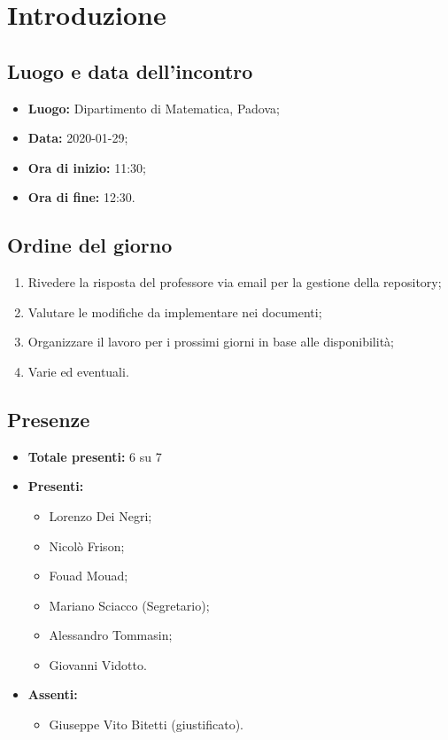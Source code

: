 \section*{Introduzione}

\subsection*{Luogo e data dell'incontro}
	\begin{itemize}
		\item \textbf{Luogo:} Dipartimento di Matematica, Padova;
		\item \textbf{Data:} 2020-01-29;
		\item \textbf{Ora di inizio:} 11:30;
		\item \textbf{Ora di fine:} 12:30.
	\end{itemize}

\subsection*{Ordine del giorno}
	\begin{enumerate}
			\item Rivedere la risposta del professore via email per la gestione della repository;
  			\item Valutare le modifiche da implementare nei documenti;
  			\item Organizzare il lavoro per i prossimi giorni in base alle disponibilità;
  			\item Varie ed eventuali.
	\end{enumerate}

\subsection*{Presenze}
	\begin{itemize}
		\item \textbf{Totale presenti:} 6 su 7
		\item \textbf{Presenti: }
			\begin{itemize}			
				\item Lorenzo Dei Negri;
				\item Nicolò Frison;
				\item Fouad Mouad;
				\item Mariano Sciacco (Segretario);
				\item Alessandro Tommasin;
				\item Giovanni Vidotto.
			\end{itemize}
		\item \textbf{Assenti: } 
			\begin{itemize}	
				\item Giuseppe Vito Bitetti (giustificato).
			\end{itemize}
	\end{itemize}


